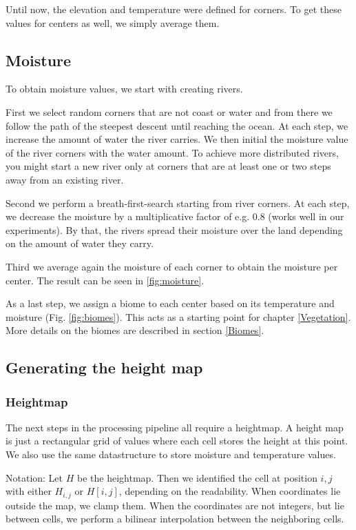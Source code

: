 \documentclass[journal, letterpaper]{IEEEtran}
\begin{document}
Until now, the elevation and temperature were defined for corners. To get these values for centers as well, we simply average them.

\subsection{Moisture}
To obtain moisture values, we start with creating rivers.

First we select random corners that are not coast or water and from there we follow the path of the steepest descent until reaching the ocean. At each step, we increase the amount of water the river carries. We then initial the moisture value of the river corners with the water amount. To achieve more distributed rivers, you might start a new river only at corners that are at least one or two steps away from an existing river.

Second we perform a breath-first-search starting from river corners. At each step, we decrease the moisture by a multiplicative factor of e.g. 0.8 (works well in our experiments). By that, the rivers spread their moisture over the land depending on the amount of water they carry.

Third we average again the moisture of each corner to obtain the moisture per center.
The result can be seen in \ref{fig:moisture}.

As a last step, we assign a biome to each center based on its temperature and moisture (Fig. \ref{fig:biomes}). This acts as a starting point for chapter \ref{Vegetation}. More details on the biomes are described in section \ref{Biomes}.

\subsection{Generating the height map}
\subsubsection{Heightmap}
The next steps in the processing pipeline all require a heightmap. A height map is just a rectangular grid of values where each cell stores the height at this point. We also use the same datastructure to store moisture and temperature values.

Notation: Let $H$ be the heightmap. Then we identified the cell at position $i,j$ with either $H_{i,j}$ or $H[i,j]$, depending on the readability. When coordinates lie outside the map, we clamp them. When the coordinates are not integers, but lie between cells, we perform a bilinear interpolation between the neighboring cells.
\end{document}

